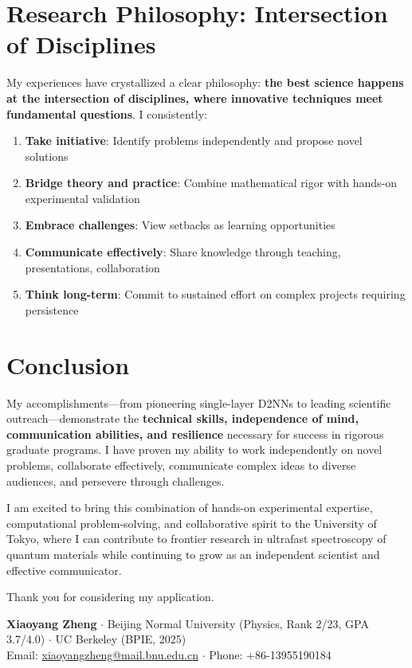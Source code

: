 \documentclass[11pt,a4paper]{article}
\begin{document}
\section{Research Philosophy: Intersection of Disciplines}

My experiences have crystallized a clear philosophy: \textbf{the best science happens at the intersection of disciplines, where innovative techniques meet fundamental questions}. I consistently:

\begin{enumerate}
    \item \textbf{Take initiative}: Identify problems independently and propose novel solutions
    \item \textbf{Bridge theory and practice}: Combine mathematical rigor with hands-on experimental validation
    \item \textbf{Embrace challenges}: View setbacks as learning opportunities
    \item \textbf{Communicate effectively}: Share knowledge through teaching, presentations, collaboration
    \item \textbf{Think long-term}: Commit to sustained effort on complex projects requiring persistence
\end{enumerate}

\section{Conclusion}

My accomplishments—from pioneering single-layer D2NNs to leading scientific outreach—demonstrate the \textbf{technical skills, independence of mind, communication abilities, and resilience} necessary for success in rigorous graduate programs. I have proven my ability to work independently on novel problems, collaborate effectively, communicate complex ideas to diverse audiences, and persevere through challenges.

I am excited to bring this combination of hands-on experimental expertise, computational problem-solving, and collaborative spirit to the University of Tokyo, where I can contribute to frontier research in ultrafast spectroscopy of quantum materials while continuing to grow as an independent scientist and effective communicator.

Thank you for considering my application.

\vspace{0.3em}

\noindent
\textbf{Xiaoyang Zheng} $\cdot$ Beijing Normal University (Physics, Rank 2/23, GPA 3.7/4.0) $\cdot$ UC Berkeley (BPIE, 2025)\\
Email: \href{mailto:xiaoyangzheng@mail.bnu.edu.cn}{xiaoyangzheng@mail.bnu.edu.cn} $\cdot$ Phone: +86-13955190184
\end{document}
